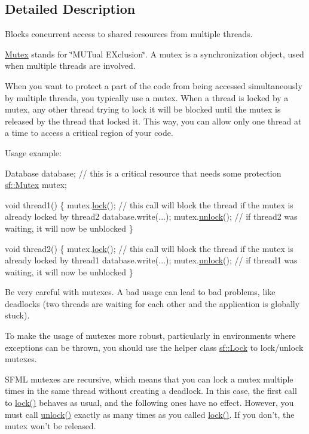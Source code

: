 \subsection{Detailed Description}
Blocks concurrent access to shared resources from multiple threads. 

\hyperlink{classsf_1_1_mutex}{Mutex} stands for \char`\"{}\-M\-U\-Tual E\-Xclusion\char`\"{}. A mutex is a synchronization object, used when multiple threads are involved.

When you want to protect a part of the code from being accessed simultaneously by multiple threads, you typically use a mutex. When a thread is locked by a mutex, any other thread trying to lock it will be blocked until the mutex is released by the thread that locked it. This way, you can allow only one thread at a time to access a critical region of your code.

Usage example\-: 
\begin{DoxyCode}
Database database; \textcolor{comment}{// this is a critical resource that needs some protection}
\hyperlink{classsf_1_1_mutex}{sf::Mutex} mutex;

\textcolor{keywordtype}{void} thread1()
\{
    mutex.\hyperlink{classsf_1_1_mutex_a1a16956a6bbea764480c1b80f2e45763}{lock}(); \textcolor{comment}{// this call will block the thread if the mutex is already locked by thread2}
    database.write(...);
    mutex.\hyperlink{classsf_1_1_mutex_ade71268ffc5e80756652058b01c23c33}{unlock}(); \textcolor{comment}{// if thread2 was waiting, it will now be unblocked}
\}

\textcolor{keywordtype}{void} thread2()
\{
    mutex.\hyperlink{classsf_1_1_mutex_a1a16956a6bbea764480c1b80f2e45763}{lock}(); \textcolor{comment}{// this call will block the thread if the mutex is already locked by thread1}
    database.write(...);
    mutex.\hyperlink{classsf_1_1_mutex_ade71268ffc5e80756652058b01c23c33}{unlock}(); \textcolor{comment}{// if thread1 was waiting, it will now be unblocked}
\}
\end{DoxyCode}


Be very careful with mutexes. A bad usage can lead to bad problems, like deadlocks (two threads are waiting for each other and the application is globally stuck).

To make the usage of mutexes more robust, particularly in environments where exceptions can be thrown, you should use the helper class \hyperlink{classsf_1_1_lock}{sf\-::\-Lock} to lock/unlock mutexes.

S\-F\-M\-L mutexes are recursive, which means that you can lock a mutex multiple times in the same thread without creating a deadlock. In this case, the first call to \hyperlink{classsf_1_1_mutex_a1a16956a6bbea764480c1b80f2e45763}{lock()} behaves as usual, and the following ones have no effect. However, you must call \hyperlink{classsf_1_1_mutex_ade71268ffc5e80756652058b01c23c33}{unlock()} exactly as many times as you called \hyperlink{classsf_1_1_mutex_a1a16956a6bbea764480c1b80f2e45763}{lock()}. If you don't, the mutex won't be released.

